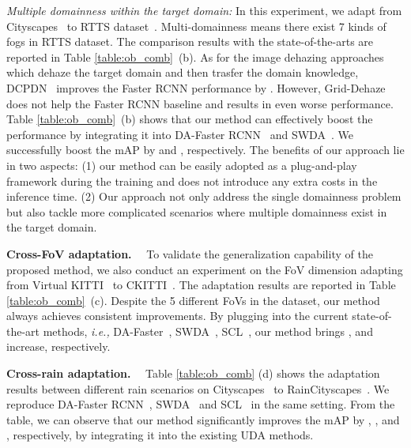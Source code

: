 \documentclass[10pt,journal,compsoc]{IEEEtran}
\renewcommand{\paragraph}[1]{\noindent\textbf{#1}~~}
\begin{document}
\noindent \emph{Multiple domainness within the target domain:} In this experiment, we adapt from Cityscapes~\cite{cordts2016cityscapes} to RTTS dataset~\cite{RTTS}. Multi-domainness means there exist 7 kinds of fogs in RTTS dataset.
The comparison results with the state-of-the-arts are reported in Table \ref{table:ob_comb}~(b). As for the image dehazing approaches which dehaze the target domain and then trasfer the domain knowledge, DCPDN~\cite{zhang2018densely} improves the Faster RCNN performance by . However, Grid-Dehaze~\cite{liu2019griddehazenet} does not help the Faster RCNN baseline and results in even worse performance. 
Table \ref{table:ob_comb}~(b) shows that our method can effectively boost the performance by integrating it into   DA-Faster RCNN~\cite{DA-Faster-RCNN} and SWDA~\cite{SWDA}. We successfully boost the mAP by  and , respectively. The benefits of our approach lie in two aspects: (1) our method can be easily adopted as a plug-and-play framework during the training and does not introduce any extra costs in the inference time. (2) Our approach not only address the single domainness problem but also tackle more complicated scenarios where multiple domainness exist in the target domain.




\paragraph{Cross-FoV adaptation.} To validate the generalization capability of the proposed method, we also conduct an experiment on the FoV dimension adapting from Virtual KITTI~\cite{VKITTI} to CKITTI~\cite{cordts2016cityscapes,kITTI}. 
The adaptation results are reported in Table \ref{table:ob_comb}~(c). Despite the 5 different FoVs in the dataset, our method always achieves consistent improvements. By plugging into the current state-of-the-art methods, \emph{i.e.,} DA-Faster~\cite{DA-Faster-RCNN}, SWDA~\cite{SWDA}, SCL~\cite{SCL},
our method brings ,  and  increase, respectively.



\paragraph{Cross-rain adaptation.} 
Table \ref{table:ob_comb} (d) shows the adaptation results between different rain scenarios on Cityscapes~\cite{cordts2016cityscapes} to RainCityscapes~\cite{rainy_city}. We reproduce DA-Faster RCNN~\cite{DA-Faster-RCNN},  SWDA~\cite{SWDA} and SCL~\cite{SCL} in the same setting. From the table, we can observe that our method significantly improves the mAP by , , and , respectively, by integrating it into the existing UDA methods.
\end{document}

